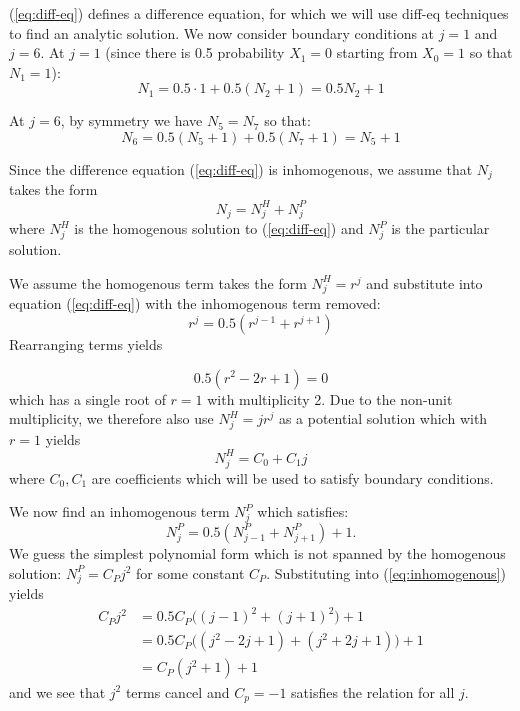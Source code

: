 \documentclass{homework}
\begin{document}
(\ref{eq:diff-eq}) defines a difference equation, for which we will
use diff-eq techniques to find an analytic solution.
We now consider boundary conditions at $j=1$ and $j=6$.
At $j=1$ (since there is 0.5 probability $X_1 = 0$ starting from $X_0 = 1$
so that $N_1=1$):
\begin{equation}
    N_1 = 0.5 \cdot 1 + 0.5 (N_2 + 1) = 0.5 N_2 + 1
    \label{eq:n1}
\end{equation}

At $j=6$, by symmetry we have $N_5=N_7$ so that:
\begin{equation}
    N_6 = 0.5(N_5 + 1) + 0.5 (N_7 + 1) = N_5 + 1
    \label{eq:n6}
\end{equation}


Since the difference equation (\ref{eq:diff-eq})
is inhomogenous, we assume that $N_j$ takes the form
\begin{equation*}
    N_j = N_j^H + N_j^P
\end{equation*}
where $N_j^H$ is the homogenous solution to (\ref{eq:diff-eq}) and $N_j^P$
is the particular solution.

We assume the homogenous term takes the form $N_j^H = r^j$ and substitute
into equation (\ref{eq:diff-eq}) with the inhomogenous term removed:
\begin{equation*}
    r^j = 0.5 (r^{j-1} + r^{j+1})
\end{equation*}
Rearranging terms yields

\begin{equation*}
    0.5 (r^2 - 2r + 1) = 0
\end{equation*}
which has a single root of $r=1$ with multiplicity 2. Due to the
non-unit multiplicity, we therefore
also use $N_j^H = jr^j$ as a potential solution which with $r=1$ yields
\begin{equation*}
    N_j^H = C_0 + C_1 j
\end{equation*}
where $C_0,C_1$ are coefficients which will be used to satisfy boundary conditions.

We now find an inhomogenous term $N_j^P$ which satisfies:
\begin{equation}
    N_j^P = 0.5 (N_{j-1}^P + N_{j+1}^P) + 1.
    \label{eq:inhomogenous}
\end{equation}
We guess the simplest polynomial form which is not spanned by the homogenous
solution: $N_j^P = C_P j^2$ for some constant $C_P$. Substituting into
(\ref{eq:inhomogenous}) yields
\begin{align*}
    C_Pj^2 &= 0.5 C_P \bigl( (j-1)^2 + (j+1)^2 \bigr) + 1 \\
        &= 0.5 C_P\bigl((j^2 - 2j + 1) + (j^2 + 2j + 1)\bigr) + 1 \\
        &= C_P(j^2 + 1) + 1
\end{align*}
and we see that $j^2$ terms cancel and $C_p = -1$ satisfies the relation for all $j$.
\end{document}
